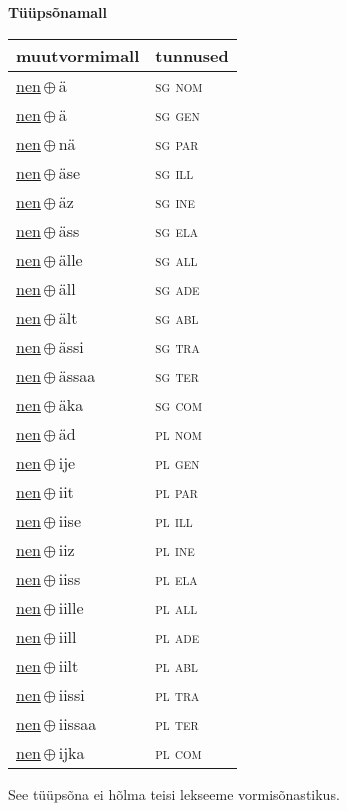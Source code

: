 

\vspace{3.5em}
\noindent \begin{minipage}{\textwidth}
\noindent \textbf{Tüüpsõnamall \,}\\

\begin{sideways}
\begin{tabular}{l l}
muutvormimall & tunnused \\
\hline
\underline{nen}\,$\oplus$\,ä & \textsc{ sg nom } \\
\underline{nen}\,$\oplus$\,ä & \textsc{ sg gen } \\
\underline{nen}\,$\oplus$\,nä & \textsc{ sg par } \\
\underline{nen}\,$\oplus$\,äse & \textsc{ sg ill } \\
\underline{nen}\,$\oplus$\,äz & \textsc{ sg ine } \\
\underline{nen}\,$\oplus$\,äss & \textsc{ sg ela } \\
\underline{nen}\,$\oplus$\,älle & \textsc{ sg all } \\
\underline{nen}\,$\oplus$\,äll & \textsc{ sg ade } \\
\underline{nen}\,$\oplus$\,ält & \textsc{ sg abl } \\
\underline{nen}\,$\oplus$\,ässi & \textsc{ sg tra } \\
\underline{nen}\,$\oplus$\,ässaa & \textsc{ sg ter } \\
\underline{nen}\,$\oplus$\,äka & \textsc{ sg com } \\
\underline{nen}\,$\oplus$\,äd & \textsc{ pl nom } \\
\underline{nen}\,$\oplus$\,ije & \textsc{ pl gen } \\
\underline{nen}\,$\oplus$\,iit & \textsc{ pl par } \\
\underline{nen}\,$\oplus$\,iise & \textsc{ pl ill } \\
\underline{nen}\,$\oplus$\,iiz & \textsc{ pl ine } \\
\underline{nen}\,$\oplus$\,iiss & \textsc{ pl ela } \\
\underline{nen}\,$\oplus$\,iille & \textsc{ pl all } \\
\underline{nen}\,$\oplus$\,iill & \textsc{ pl ade } \\
\underline{nen}\,$\oplus$\,iilt & \textsc{ pl abl } \\
\underline{nen}\,$\oplus$\,iissi & \textsc{ pl tra } \\
\underline{nen}\,$\oplus$\,iissaa & \textsc{ pl ter } \\
\underline{nen}\,$\oplus$\,ijka & \textsc{ pl com } \\
\end{tabular}
\end{sideways}
\label{tab:tüüpsõnamall-nenä}

\end{minipage}

 
\vspace{1em}
\noindent See tüüpsõna ei hõlma teisi lekseeme vormi\-sõnastikus.
